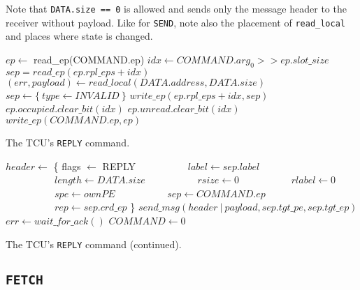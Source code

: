 Note that \texttt{DATA.size == 0} is allowed and sends only the message header to the receiver
without payload. Like for \texttt{SEND}, note also the placement of \texttt{read\_local} and places
where state is changed.

\begin{algorithm}
    $ep \gets$ read\_ep(COMMAND.ep)\;
    \extend{}
    \BlankLine
    $idx \gets COMMAND.arg_0 >> ep.slot\_size$\;
    $sep = read\_ep(ep.rpl\_eps + idx)$\;
    \BlankLine
    $(err, payload) \gets read\_local(DATA.address, DATA.size)$\;
    \extend{}
    \BlankLine
    $sep \gets \{~type \gets INVALID~\}$\;
    $write\_ep(ep.rpl\_eps + idx, sep)$\;
    \BlankLine
    \extend{}
    \BlankLine
    $ep.occupied.clear\_bit(idx)$\;
    $ep.unread.clear\_bit(idx)$\;
    $write\_ep(COMMAND.ep, ep)$\;
    \caption{The TCU's \texttt{REPLY} command.}
\end{algorithm}

\begin{algorithm}
    \setcounter{AlgoLine}{29}
    $header \gets$ \{ flags $\gets$ REPLY\;
    $\quad\quad\quad\quad\quad label \gets sep.label$\;
    $\quad\quad\quad\quad\quad length \gets DATA.size$\;
    $\quad\quad\quad\quad\quad rsize \gets 0$\;
    $\quad\quad\quad\quad\quad rlabel \gets 0$\;
    $\quad\quad\quad\quad\quad spe \gets ownPE$\;
    $\quad\quad\quad\quad\quad sep \gets COMMAND.ep$\;
    $\quad\quad\quad\quad\quad rep \gets sep.crd\_ep$ \}\;
    $send\_msg(header\ |\ payload, sep.tgt\_pe, sep.tgt\_ep)$\;
    $err \gets wait\_for\_ack()$\;
    \BlankLine
    $COMMAND \gets 0$\;
    \caption{The TCU's \texttt{REPLY} command (continued).}
\end{algorithm}

\subsection{\texttt{FETCH}}

